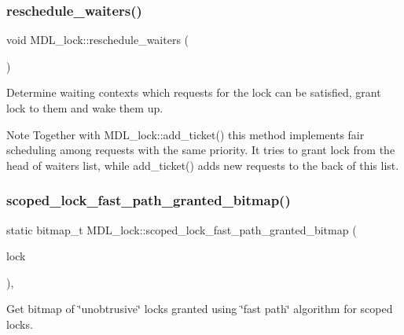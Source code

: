 \subsubsection{\texorpdfstring{reschedule\+\_\+waiters()}{reschedule\_waiters()}}
{\footnotesize\ttfamily void M\+D\+L\+\_\+lock\+::reschedule\+\_\+waiters (\begin{DoxyParamCaption}{ }\end{DoxyParamCaption})}

Determine waiting contexts which requests for the lock can be satisfied, grant lock to them and wake them up.

\begin{DoxyNote}{Note}
Together with M\+D\+L\+\_\+lock\+::add\+\_\+ticket() this method implements fair scheduling among requests with the same priority. It tries to grant lock from the head of waiters list, while add\+\_\+ticket() adds new requests to the back of this list. 
\end{DoxyNote}
\mbox{\label{classMDL__lock_a8d5ce95948e006dbe957792a4be80928}} 
\subsubsection{\texorpdfstring{scoped\+\_\+lock\+\_\+fast\+\_\+path\+\_\+granted\+\_\+bitmap()}{scoped\_lock\_fast\_path\_granted\_bitmap()}}
{\footnotesize\ttfamily static bitmap\+\_\+t M\+D\+L\+\_\+lock\+::scoped\+\_\+lock\+\_\+fast\+\_\+path\+\_\+granted\+\_\+bitmap (\begin{DoxyParamCaption}\item[{const \mbox{\hyperlink{classMDL__lock}{M\+D\+L\+\_\+lock}} \&}]{lock }\end{DoxyParamCaption})\hspace{0.3cm}{\ttfamily [inline]}, {\ttfamily [static]}}

Get bitmap of \char`\"{}unobtrusive\char`\"{} locks granted using \char`\"{}fast path\char`\"{} algorithm for scoped locks.

